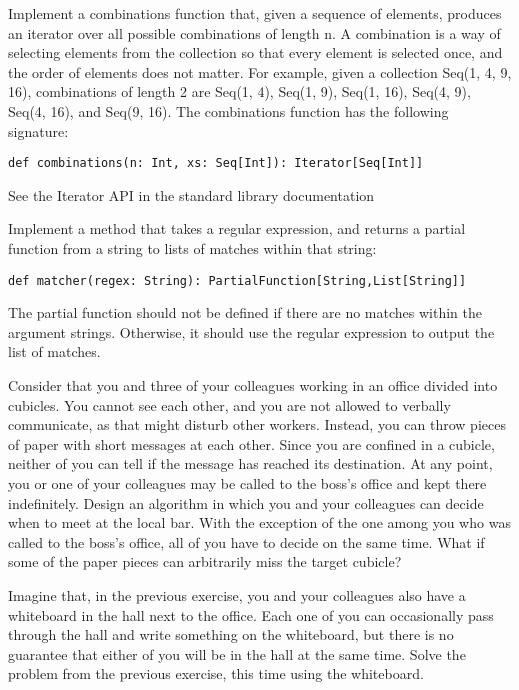 \documentclass[11pt]{article}
\begin{document}
\begin{myExercise}
Implement a combinations function that, given a sequence of elements, produces an iterator over all possible combinations of length n. A combination is a way of selecting elements from the collection so that every element is selected once, and the order of elements does not matter. For example, given a collection Seq(1, 4, 9, 16), combinations of length 2 are Seq(1, 4), Seq(1, 9), Seq(1, 16), Seq(4, 9), Seq(4, 16), and Seq(9, 16). The combinations function has the following signature:
\begin{lstlisting}
def combinations(n: Int, xs: Seq[Int]): Iterator[Seq[Int]]
\end{lstlisting}
See the Iterator API in the standard library documentation
\end{myExercise}


\begin{myExercise}
Implement a method that takes a regular expression, and returns a partial function from a string to lists of matches within that string:
\begin{lstlisting}
def matcher(regex: String): PartialFunction[String,List[String]]
\end{lstlisting}
The partial function should not be defined if there are no matches within the argument strings. Otherwise, it should use the regular expression to output the list of matches.
\end{myExercise}


\begin{myExercise}
Consider that you and three of your colleagues working in an office divided into cubicles. You cannot see each other, and you are not allowed to verbally communicate, as that might disturb other workers. Instead, you can throw pieces of paper with short messages at each other. Since you are confined in a cubicle, neither of you can tell if the message has reached its destination. At any point, you or one of your colleagues may be called to the boss's office and kept there indefinitely. Design an algorithm in which you and your colleagues can decide when to meet at the local bar. With the exception of the one among you who was called to the boss's office, all of you have to decide on the same time. What if some of the paper pieces can arbitrarily miss the target cubicle?
\end{myExercise}

\begin{myExercise}
Imagine that, in the previous exercise, you and your colleagues also have a whiteboard in the hall next to the office. Each one of you can occasionally pass through the hall and write something on the whiteboard, but there is no guarantee that either of you will be in the hall at the same time.
Solve the problem from the previous exercise, this time using the whiteboard.
\end{myExercise}
\end{document}
